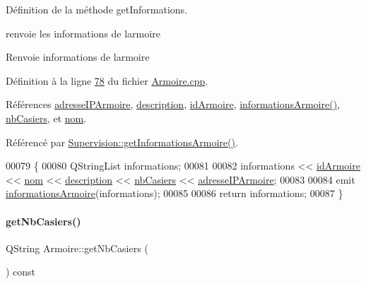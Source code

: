 Définition de la méthode get\+Informations. 

renvoie les informations de l\textquotesingle{}armoire \begin{DoxyReturn}{Renvoie}
informations de l\textquotesingle{}armoire 
\end{DoxyReturn}


Définition à la ligne \hyperlink{_armoire_8cpp_source_l00078}{78} du fichier \hyperlink{_armoire_8cpp_source}{Armoire.\+cpp}.



Références \hyperlink{_armoire_8h_source_l00070}{adresse\+I\+P\+Armoire}, \hyperlink{_armoire_8h_source_l00068}{description}, \hyperlink{_armoire_8h_source_l00066}{id\+Armoire}, \hyperlink{class_armoire_a1fc00ceaa842f579ee31c532a9b01508}{informations\+Armoire()}, \hyperlink{_armoire_8h_source_l00069}{nb\+Casiers}, et \hyperlink{_armoire_8h_source_l00067}{nom}.



Référencé par \hyperlink{_supervision_8cpp_source_l00111}{Supervision\+::get\+Informations\+Armoire()}.


\begin{DoxyCode}
00079 \{
00080     QStringList informations;
00081 
00082     informations << \hyperlink{class_armoire_a131caceb7d4b90cb7761851757e80f57}{idArmoire} << \hyperlink{class_armoire_a1de028da0fa3f085e2feaad8311d8795}{nom} << \hyperlink{class_armoire_aa18be328693d7602439c779e30156c02}{description} << 
      \hyperlink{class_armoire_a9c4e926b7cddb13d097b75b3f5ef3de8}{nbCasiers} << \hyperlink{class_armoire_ab96bd042aa78eaefba0aefb860684ca6}{adresseIPArmoire};
00083 
00084     emit \hyperlink{class_armoire_a1fc00ceaa842f579ee31c532a9b01508}{informationsArmoire}(informations);
00085 
00086     \textcolor{keywordflow}{return} informations;
00087 \}
\end{DoxyCode}
\mbox{\label{class_armoire_aa94faaf53b6da5139a22a2ab21d4cf12}} 
\paragraph{\texorpdfstring{get\+Nb\+Casiers()}{getNbCasiers()}}
{\footnotesize\ttfamily Q\+String Armoire\+::get\+Nb\+Casiers (\begin{DoxyParamCaption}{ }\end{DoxyParamCaption}) const}



